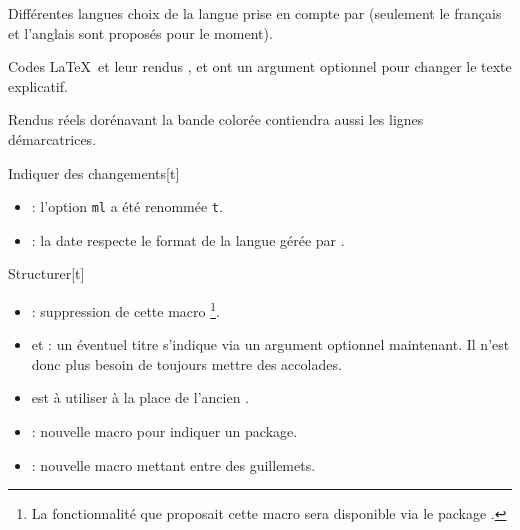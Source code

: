 \begin{bdoctopic}{Différentes langues}
    choix de la langue prise en compte par 
    (seulement le français et l'anglais sont proposés pour le moment).
\end{bdoctopic}




\begin{bdoctopic}{Codes \LaTeX\ et leur rendus}
    ,
    et
    ont un argument optionnel pour changer le texte explicatif.
\end{bdoctopic}




\begin{bdoctopic}{Rendus réels}
    dorénavant la bande colorée contiendra aussi les lignes démarcatrices.
\end{bdoctopic}




\begin{bdoctopic}{Indiquer des changements}[t]
    \begin{itemize}
        \item {} : 
              l'option \texttt{ml} a été renommée \texttt{t}.

        \item {} :
              la date respecte le format de la langue gérée par .
    \end{itemize}
\end{bdoctopic}




\begin{bdoctopic}{Structurer}[t]
    \begin{itemize}
        \item {} :
              suppression de cette macro
              \footnote{
                  La fonctionnalité que proposait cette macro sera disponible via le package .
              }.

        \item {} et  :
              un éventuel titre s'indique via un argument optionnel maintenant.
              Il n'est donc plus besoin de toujours mettre des accolades.

        \item {}
              est à utiliser à la place de l'ancien
              .

        \item {} :
              nouvelle macro pour indiquer un package.

        \item {} :
              nouvelle macro mettant entre des guillemets.
    \end{itemize}
\end{bdoctopic}

